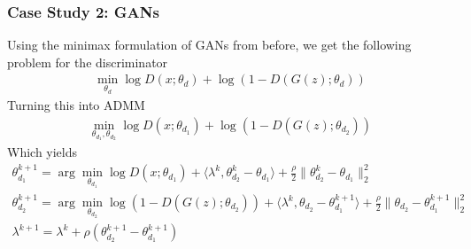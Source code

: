 \documentclass{beamer}
\begin{document}
\begin{frame}
\frametitle{Case Study 2: GANs}
  Using the minimax formulation of GANs from before, we get the following problem for the discriminator
  \begin{gather*}
    \min_{\theta_d} \log D(x; \theta_d) + \log (1 - D(G(z); \theta_d))
  \end{gather*}
  Turning this into ADMM
  \begin{gather*}
    \min_{\theta_{d_1}, \theta_{d_2}} \log D(x; \theta_{d_1}) + \log (1 - D(G(z); \theta_{d_2}))
  \end{gather*}
  Which yields
  \begin{gather*}
    \theta_{d_1}^{k+1} = \arg\min_{\theta_{d_1}} \log D(x ; \theta_{d_1}) + \langle \lambda^k, \theta_{d_2}^k - \theta_{d_1} \rangle + \frac{\rho}{2} \lVert \theta_{d_2}^k - \theta_{d_1} \rVert_2^2 \\
    \theta_{d_2}^{k+1} = \arg\min_{\theta_{d_2}} \log(1 - D(G(z) ; \theta_{d_2})) + \langle \lambda^k, \theta_{d_2} - \theta_{d_1}^{k+1} \rangle + \frac{\rho}{2} \lVert \theta_{d_2} - \theta_{d_1}^{k+1} \rVert_2^2 \\
    \lambda^{k+1} = \lambda^k + \rho (\theta_{d_2}^{k+1} - \theta_{d_1}^{k+1})
  \end{gather*}
\end{frame}

\end{document}
